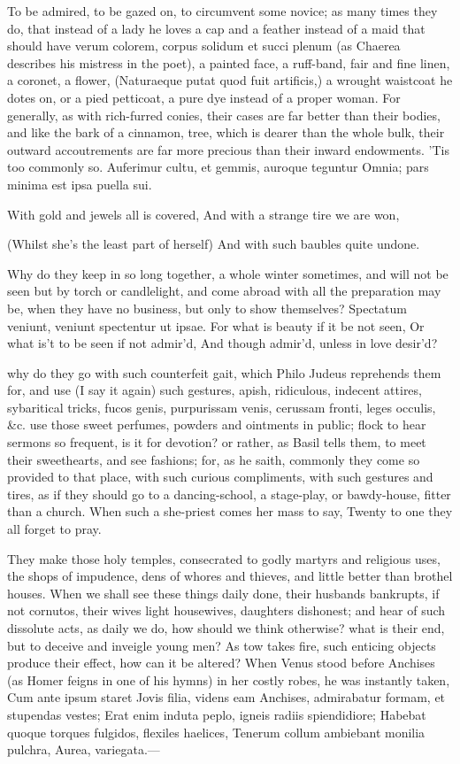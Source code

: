 {To be admired, to be gazed on, to circumvent some novice; as many times
they do, that instead of a lady he loves a cap and a feather instead of
a maid that should have verum colorem, corpus solidum et succi plenum
(as Chaerea describes his mistress in the poet), a painted face,
a ruff-band, fair and fine linen, a coronet, a flower,
(Naturaeque putat quod fuit artificis,) a wrought waistcoat he
dotes on, or a pied petticoat, a pure dye instead of a proper woman.
For generally, as with rich-furred conies, their cases are far better
than their bodies, and like the bark of a cinnamon, tree, which is
dearer than the whole bulk, their outward accoutrements are far more
precious than their inward endowments. 'Tis too commonly so.
Auferimur cultu, et gemmis, auroque teguntur
Omnia; pars minima est ipsa puella sui.


With gold and jewels all is covered,
And with a strange tire we are won,

(Whilst she's the least part of herself)
And with such baubles quite undone.

Why do they keep in so long together, a whole winter sometimes, and
will not be seen but by torch or candlelight, and come abroad with all
the preparation may be, when they have no business, but only to show
themselves? Spectatum veniunt, veniunt spectentur ut ipsae.
For what is beauty if it be not seen,
Or what is't to be seen if not admir'd,
And though admir'd, unless in love desir'd?

why do they go with such counterfeit gait, which Philo Judeus
reprehends them for, and use (I say it again) such gestures, apish,
ridiculous, indecent attires, sybaritical tricks, fucos genis,
purpurissam venis, cerussam fronti, leges occulis, \&c. use those sweet
perfumes, powders and ointments in public; flock to hear sermons so
frequent, is it for devotion? or rather, as Basil tells them, to
meet their sweethearts, and see fashions; for, as he saith, commonly
they come so provided to that place, with such curious compliments,
with such gestures and tires, as if they should go to a dancing-school,
a stage-play, or bawdy-house, fitter than a church.
When such a she-priest comes her mass to say,
Twenty to one they all forget to pray.

They make those holy temples, consecrated to godly martyrs and
religious uses, the shops of impudence, dens of whores and thieves, and
little better than brothel houses. When we shall see these things daily
done, their husbands bankrupts, if not cornutos, their wives light
housewives, daughters dishonest; and hear of such dissolute acts, as
daily we do, how should we think otherwise? what is their end, but to
deceive and inveigle young men? As tow takes fire, such enticing
objects produce their effect, how can it be altered? When Venus stood
before Anchises (as Homer feigns in one of his hymns) in her
costly robes, he was instantly taken,
Cum ante ipsum staret Jovis filia, videns eam
Anchises, admirabatur formam, et stupendas vestes;
Erat enim induta peplo, igneis radiis spiendidiore;
Habebat quoque torques fulgidos, flexiles haelices,
Tenerum collum ambiebant monilia pulchra,
Aurea, variegata.---

}
